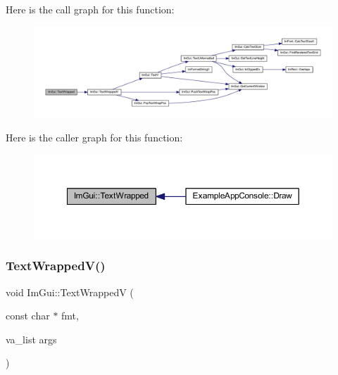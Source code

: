 Here is the call graph for this function\+:
\nopagebreak
\begin{figure}[H]
\begin{center}
\leavevmode
\includegraphics[width=350pt]{namespace_im_gui_ad57bb15c599e73b2ccc7c0f7de6e5823_cgraph}
\end{center}
\end{figure}
Here is the caller graph for this function\+:
\nopagebreak
\begin{figure}[H]
\begin{center}
\leavevmode
\includegraphics[width=350pt]{namespace_im_gui_ad57bb15c599e73b2ccc7c0f7de6e5823_icgraph}
\end{center}
\end{figure}
\mbox{\label{namespace_im_gui_a9019a388cd0c410bcb3d3ae63a008123}} 
\subsubsection{\texorpdfstring{Text\+Wrapped\+V()}{TextWrappedV()}}
{\footnotesize\ttfamily void Im\+Gui\+::\+Text\+WrappedV (\begin{DoxyParamCaption}\item[{const char $\ast$}]{fmt,  }\item[{va\+\_\+list}]{args }\end{DoxyParamCaption})}


